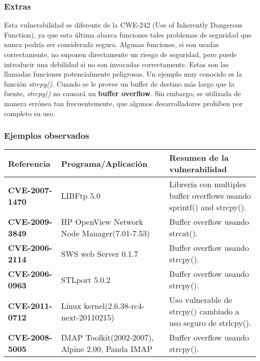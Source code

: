 \subsubsection{Extras}

Esta vulnerabilidad es diferente de la CWE-242 (Use of Inherently Dangerous Function), ya que esta última abarca funciones tales problemas de seguridad que nunca podría ser
considerada segura. Algunas funciones, si son usadas correctamente, no suponen directamente un riesgo de seguridad, pero puede introducir una debilidad si no son
invocadas correctamente. Estas son las llamadas funciones potencialmente peligrosas. Un ejemplo muy conocido es la función \textit{strcpy()}. Cuando se le provee un buffer
de destino más largo que la fuente, \textit{strcpy()} no causará un \textbf{buffer overflow}. Sin embargo, se utilizada de manera errónea tan frecuentemente, que algunos desarrolladores
prohiben por completo su uso.

\subsubsection{Ejemplos observados}

\begin{tabular}[\baselineskip]{|p{1.75cm}|p{4.75cm}|p{6.5cm}|}
  \hline
  \textbf{Referencia} & Programa/Aplicación & Resumen de la vulnerabilidad \\
  \hline
  \textbf{CVE-2007-1470} & LIBFtp 5.0 & Librería con multiples buffer overflows usando sprintf() and strcpy().\\
  \hline
  \textbf{CVE-2009-3849} & HP OpenView Network Node Manager(7.01-7.53) & Buffer overflow usando strcat(). \\
  \hline
  \textbf{CVE-2006-2114} & SWS web Server 0.1.7  & Buffer overflow usando strcpy(). \\
  \hline
  \textbf{CVE-2006-0963} & STLport 5.0.2  & Buffer overflow usando strcpy(). \\
  \hline
  \textbf{CVE-2011-0712} & Linux kernel(2.6.38-rc4-next-20110215) & Uso vulnerable de strcpy() cambiado a uso seguro de strlcpy().\\
  \hline
  \textbf{CVE-2008-5005} & IMAP Toolkit(2002-2007), Alpine 2.00, Panda IMAP & Buffer overflow usando strcpy(). \\
  \hline
\end{tabular}